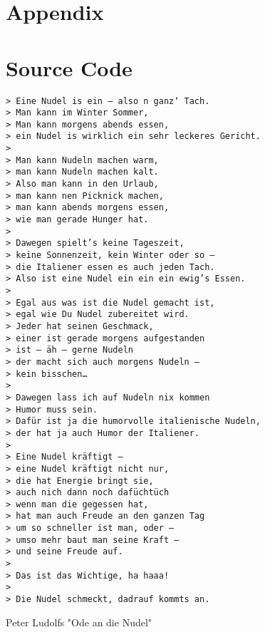 \appendix
\section*{Appendix}
\appendixtoc
\clearpage

\newenvironment{longlisting}{\captionsetup{type=listing}}{}

\section{Source Code}

\vspace{1em}

\begin{longlisting}
\begin{verbatim}
> Eine Nudel is ein – also n ganz‘ Tach.
> Man kann im Winter Sommer,
> Man kann morgens abends essen,
> ein Nudel is wirklich ein sehr leckeres Gericht.
>
> Man kann Nudeln machen warm,
> man kann Nudeln machen kalt.
> Also man kann in den Urlaub,
> man kann nen Picknick machen,
> man kann abends morgens essen,
> wie man gerade Hunger hat.
>
> Dawegen spielt’s keine Tageszeit,
> keine Sonnenzeit, kein Winter oder so –
> die Italiener essen es auch jeden Tach.
> Also ist eine Nudel ein ein ein ewig’s Essen.
>
> Egal aus was ist die Nudel gemacht ist,
> egal wie Du Nudel zubereitet wird.
> Jeder hat seinen Geschmack,
> einer ist gerade morgens aufgestanden
> ist – äh – gerne Nudeln
> der macht sich auch morgens Nudeln –
> kein bisschen…
>
> Dawegen lass ich auf Nudeln nix kommen
> Humor muss sein.
> Dafür ist ja die humorvolle italienische Nudeln,
> der hat ja auch Humor der Italiener.
>
> Eine Nudel kräftigt –
> eine Nudel kräftigt nicht nur,
> die hat Energie bringt sie,
> auch nich dann noch dafüchtüch
> wenn man die gegessen hat,
> hat man auch Freude an den ganzen Tag
> um so schneller ist man, oder –
> umso mehr baut man seine Kraft –
> und seine Freude auf.
>
> Das ist das Wichtige, ha haaa!
>
> Die Nudel schmeckt, dadrauf kommts an.
\end{verbatim}
  \caption{Peter Ludolfs "Ode an die Nudel"}
  \label{lst:ludolf-nudel}
\end{longlisting}
